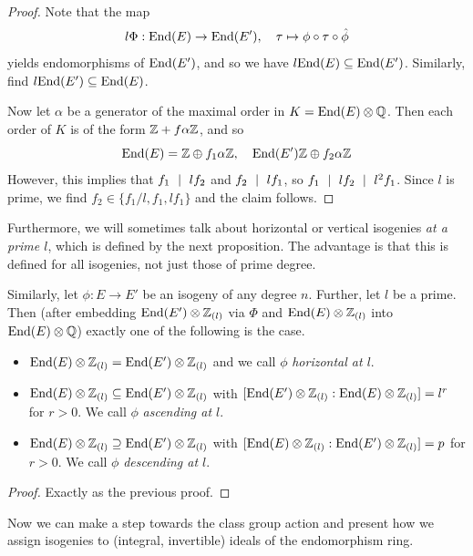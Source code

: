\begin{proof}
    Note that the map
    \begin{equation*}
        l\Phi: \mathrm{End}(E) \to \mathrm{End}(E'), \quad \tau \mapsto \phi \circ \tau \circ \hat{\phi}
    \end{equation*}
    yields endomorphisms of $\mathrm{End}(E')$, and so we have $l\mathrm{End}(E) \subseteq \mathrm{End}(E')$.
    Similarly, find $l\mathrm{End}(E') \subseteq \mathrm{End}(E)$.

    Now let $\alpha$ be a generator of the maximal order in $K = \mathrm{End}(E) \otimes \mathbb{Q}$.
    Then each order of $K$ is of the form $\mathbb{Z} + f\alpha\mathbb{Z}$, and so
    \begin{equation*}
        \mathrm{End}(E) = \mathbb{Z} \oplus f_1\alpha\mathbb{Z}, \quad \mathrm{End}(E') \mathbb{Z} \oplus f_2\alpha\mathbb{Z}
    \end{equation*}
    However, this implies that $f_1 \ \mid \  lf_2$ and $f_2 \ \mid \  lf_1$, so $f_1 \ \mid \  l f_2 \ \mid \  l^2 f_1$.
    Since $l$ is prime, we find $f_2 \in \{ f_1/l, f_1, l f_1 \}$ and the claim follows.
\end{proof}
Furthermore, we will sometimes talk about horizontal or vertical isogenies \emph{at a prime $l$}, which is defined by the next proposition.
The advantage is that this is defined for all isogenies, not just those of prime degree.
\begin{prop}
    Similarly, let $\phi: E \to E'$ be an isogeny of any degree $n$.
    Further, let $l$ be a prime.
    Then (after embedding $\mathrm{End}(E') \otimes \mathbb{Z}_{(l)}$ via $\Phi$ and $\mathrm{End}(E) \otimes \mathbb{Z}_{(l)}$ into $\mathrm{End}(E) \otimes \mathbb{Q}$) exactly one of the following is the case.
    \begin{itemize}
        \item $\mathrm{End}(E) \otimes \mathbb{Z}_{(l)} = \mathrm{End}(E') \otimes \mathbb{Z}_{(l)}$ and we call $\phi$ \emph{horizontal at $l$}.
        \item $\mathrm{End}(E) \otimes \mathbb{Z}_{(l)} \subseteq \mathrm{End}(E') \otimes \mathbb{Z}_{(l)}$ with $[\mathrm{End}(E') \otimes \mathbb{Z}_{(l)} : \mathrm{End}(E) \otimes \mathbb{Z}_{(l)}] = l^r$ for $r > 0$. We call $\phi$ \emph{ascending at $l$}.
        \item $\mathrm{End}(E) \otimes \mathbb{Z}_{(l)} \supseteq \mathrm{End}(E') \otimes \mathbb{Z}_{(l)}$ with $[\mathrm{End}(E) \otimes \mathbb{Z}_{(l)} : \mathrm{End}(E') \otimes \mathbb{Z}_{(l)}] = p$ for $r > 0$. We call $\phi$ \emph{descending at $l$}.
    \end{itemize}
\end{prop}
\begin{proof}
    Exactly as the previous proof.
\end{proof}
Now we can make a step towards the class group action and present how we assign isogenies to (integral, invertible) ideals of the endomorphism ring.
